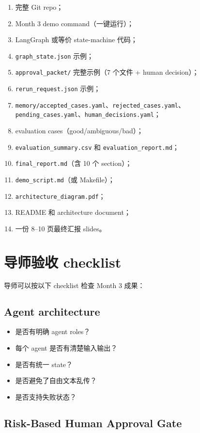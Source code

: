 \documentclass[11pt,a4paper,fontset=none]{ctexart}
\begin{document}
\begin{enumerate}[leftmargin=2em]
  \item 完整 Git repo；
  \item Month 3 demo command（一键运行）；
  \item LangGraph 或等价 state-machine 代码；
  \item \texttt{graph\_state.json} 示例；
  \item \texttt{approval\_packet/} 完整示例（7 个文件 + human decision）；
  \item \texttt{rerun\_request.json} 示例；
  \item \texttt{memory/accepted\_cases.yaml}、\texttt{rejected\_cases.yaml}、\texttt{pending\_cases.yaml}、\texttt{human\_decisions.yaml}；
  \item evaluation cases（good/ambiguous/bad）；
  \item \texttt{evaluation\_summary.csv} 和 \texttt{evaluation\_report.md}；
  \item \texttt{final\_report.md}（含 10 个 section）；
  \item \texttt{demo\_script.md}（或 Makefile）；
  \item \texttt{architecture\_diagram.pdf}；
  \item README 和 architecture document；
  \item 一份 8--10 页最终汇报 slides。
\end{enumerate}

\section{导师验收 checklist}

导师可以按以下 checklist 检查 Month 3 成果：

\subsection{Agent architecture}

\begin{itemize}[leftmargin=2em]
  \item 是否有明确 agent roles？
  \item 每个 agent 是否有清楚输入输出？
  \item 是否有统一 state？
  \item 是否避免了自由文本乱传？
  \item 是否支持失败状态？
\end{itemize}

\subsection{Risk-Based Human Approval Gate}
\end{document}

